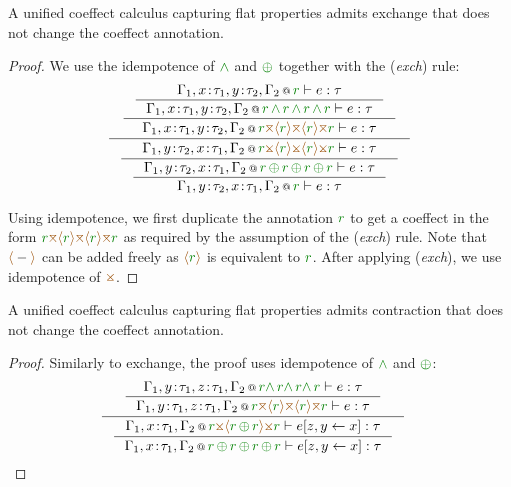 \begin{lemma}
A unified coeffect calculus capturing flat properties admits exchange that does not change the
coeffect annotation.
\end{lemma}
\begin{proof}
We use the idempotence of $\czip$ and $\cpar$ together with the (\emph{exch}) rule:
\begin{equation*}
\inference
  { \inference
      { \inference
          {\coctx{\Gamma_1,x\!:\!\tau_1,y\!:\!\tau_2,\Gamma_2}{\cclrd{r}} \vdash e : \tau}
          {\coctx{\Gamma_1,x\!:\!\tau_1,y\!:\!\tau_2,\Gamma_2}{\cclrd{r} \,\czip\, \cclrd{r} \,\czip\, \cclrd{r} \,\czip\, \cclrd{r}} \vdash e : \tau} }
      { \coctx{\Gamma_1,x\!:\!\tau_1,y\!:\!\tau_2,\Gamma_2}{\cclrd{r} \azip \alift{\cclrd{r}} \azip \alift{\cclrd{r}} \azip \cclrd{r}} \vdash e : \tau } }
  { \inference 
      {\coctx{\Gamma_1,y\!:\!\tau_2,x\!:\!\tau_1,\Gamma_2}{\cclrd{r} \apar \alift{\cclrd{r}} \apar \alift{\cclrd{r}} \apar \cclrd{r}} \vdash e : \tau}
      {\inference
         {\coctx{\Gamma_1,y\!:\!\tau_2,x\!:\!\tau_1,\Gamma_2}{\cclrd{r}\,\cpar\,\cclrd{r}\,\cpar\,\cclrd{r}\,\cpar\,\cclrd{r}} \vdash e : \tau}
         {\coctx{\Gamma_1,y\!:\!\tau_2,x\!:\!\tau_1,\Gamma_2}{\cclrd{r}} \vdash e : \tau} } }
\end{equation*}

\noindent
Using idempotence, we first duplicate the annotation $\cclrd{r}$ to get a coeffect in the form
$\cclrd{r} \azip \alift{\cclrd{r}} \azip \alift{\cclrd{r}} \azip \cclrd{r}$ as required by the
assumption of the (\emph{exch}) rule. Note that $\alift{-}$ can be added freely as
$\alift{\cclrd{r}}$ is equivalent to $\cclrd{r}$. After applying (\emph{exch}), we use 
idempotence of $\apar$.
\end{proof}

\begin{lemma}
A unified coeffect calculus capturing flat properties admits contraction that does not change the
coeffect annotation.
\end{lemma}
\begin{proof}
Similarly to exchange, the proof uses idempotence of $\czip$ and $\cpar$:
\begin{equation*}
\inference
  { \inference
      {\coctx{\Gamma_1,y\!:\!\tau_1,z\!:\!\tau_1,\Gamma_2}{\cclrd{r} \czip\, \cclrd{r} \czip\, \cclrd{r} \czip\, \cclrd{r}} \vdash e : \tau}
      {\coctx{\Gamma_1,y\!:\!\tau_1,z\!:\!\tau_1,\Gamma_2}{\cclrd{r} \azip \alift{\cclrd{r}} \azip \alift{\cclrd{r}} \azip \cclrd{r}} \vdash e : \tau} }
  { \inference
      {\coctx{\Gamma_1,x\!:\!\tau_1,\Gamma_2}{\cclrd{r} \apar \alift{\cclrd{r} \,\cpar\, \cclrd{r}} \apar \cclrd{r}} \vdash \subst{e}{z,y}{x} : \tau}
      {\coctx{\Gamma_1,x\!:\!\tau_1,\Gamma_2}{\cclrd{r} \,\cpar\, \cclrd{r} \,\cpar\, \cclrd{r} \,\cpar\, \cclrd{r}} \vdash \subst{e}{z,y}{x} : \tau} }
\begin{array}{r} \\[2.5em] \qedhere \end{array}
\end{equation*}
\end{proof}

